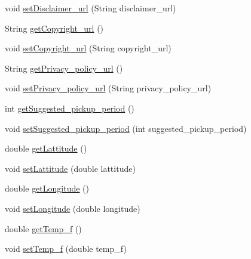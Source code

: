 \begin{DoxyCompactItemize}
\item 
void \hyperlink{classgov_1_1fnal_1_1ppd_1_1dd_1_1xml_1_1news_1_1current__observation_a08bb035d6c48aa8ccfc0b5db93d66172}{set\-Disclaimer\-\_\-url} (String disclaimer\-\_\-url)
\item 
String \hyperlink{classgov_1_1fnal_1_1ppd_1_1dd_1_1xml_1_1news_1_1current__observation_ae389e1d8780560e55e27d862921b1973}{get\-Copyright\-\_\-url} ()
\item 
void \hyperlink{classgov_1_1fnal_1_1ppd_1_1dd_1_1xml_1_1news_1_1current__observation_ab797b93042862e35b5255ed761cac467}{set\-Copyright\-\_\-url} (String copyright\-\_\-url)
\item 
String \hyperlink{classgov_1_1fnal_1_1ppd_1_1dd_1_1xml_1_1news_1_1current__observation_aed70261b70995c2b39b739deddd95de8}{get\-Privacy\-\_\-policy\-\_\-url} ()
\item 
void \hyperlink{classgov_1_1fnal_1_1ppd_1_1dd_1_1xml_1_1news_1_1current__observation_a5c8ad5812d72fd31e08c954dcc8cd2d5}{set\-Privacy\-\_\-policy\-\_\-url} (String privacy\-\_\-policy\-\_\-url)
\item 
int \hyperlink{classgov_1_1fnal_1_1ppd_1_1dd_1_1xml_1_1news_1_1current__observation_a72bd96df32e5a459dc6eb4c5dd446813}{get\-Suggested\-\_\-pickup\-\_\-period} ()
\item 
void \hyperlink{classgov_1_1fnal_1_1ppd_1_1dd_1_1xml_1_1news_1_1current__observation_a9f85349201ef4acfa12436ee29db7cc9}{set\-Suggested\-\_\-pickup\-\_\-period} (int suggested\-\_\-pickup\-\_\-period)
\item 
double \hyperlink{classgov_1_1fnal_1_1ppd_1_1dd_1_1xml_1_1news_1_1current__observation_ae45cad95929386646e22bebec46d0172}{get\-Lattitude} ()
\item 
void \hyperlink{classgov_1_1fnal_1_1ppd_1_1dd_1_1xml_1_1news_1_1current__observation_a156a0be17b29b7a2ea05d6abee2800d1}{set\-Lattitude} (double lattitude)
\item 
double \hyperlink{classgov_1_1fnal_1_1ppd_1_1dd_1_1xml_1_1news_1_1current__observation_aebb187855b3433db7ece824a757c2963}{get\-Longitude} ()
\item 
void \hyperlink{classgov_1_1fnal_1_1ppd_1_1dd_1_1xml_1_1news_1_1current__observation_aecb537d9c709a3641a5de450c480b209}{set\-Longitude} (double longitude)
\item 
double \hyperlink{classgov_1_1fnal_1_1ppd_1_1dd_1_1xml_1_1news_1_1current__observation_a3b6c6895c1de8a03d031c240752f5752}{get\-Temp\-\_\-f} ()
\item 
void \hyperlink{classgov_1_1fnal_1_1ppd_1_1dd_1_1xml_1_1news_1_1current__observation_a8ee4d21e6841b1b647472a644515deb5}{set\-Temp\-\_\-f} (double temp\-\_\-f)

\end{DoxyCompactItemize}
